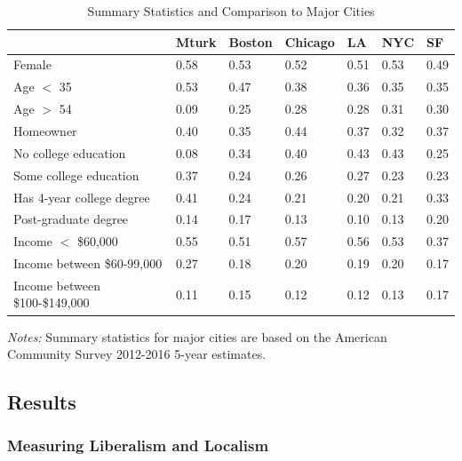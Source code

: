 \documentclass[article,11pt]{memoir}
\begin{document}
\begin{table}
  \begin{threeparttable}
  \caption{Summary Statistics and Comparison to Major Cities}
  \label{tab:e_summary_stats}
  \footnotesize
  \begin{tabularx}{\textwidth}{lXXXXXX}
    \hline
     & Mturk & Boston & Chicago & LA & NYC & SF \\ \hline
  Female & 0.58 & 0.53 & 0.52 & 0.51 & 0.53 & 0.49 \\ 
    Age $<$ 35 & 0.53 & 0.47 & 0.38 & 0.36 & 0.35 & 0.35 \\ 
    Age $>$ 54 & 0.09 & 0.25 & 0.28 & 0.28 & 0.31 & 0.30 \\ 
    Homeowner & 0.40 & 0.35 & 0.44 & 0.37 & 0.32 & 0.37 \\ 
    No college education & 0.08 & 0.34 & 0.40 & 0.43 & 0.43 & 0.25 \\ 
    Some college education & 0.37 & 0.24 & 0.26 & 0.27 & 0.23 & 0.23 \\ 
    Has 4-year college degree & 0.41 & 0.24 & 0.21 & 0.20 & 0.21 & 0.33 \\ 
    Post-graduate degree & 0.14 & 0.17 & 0.13 & 0.10 & 0.13 & 0.20 \\ 
    Income $<$ \$60,000 & 0.55 & 0.51 & 0.57 & 0.56 & 0.53 & 0.37 \\ 
    Income between \$60-99,000 & 0.27 & 0.18 & 0.20 & 0.19 & 0.20 & 0.17 \\ 
    Income between \$100-\$149,000 & 0.11 & 0.15 & 0.12 & 0.12 & 0.13 & 0.17 \\ 
     \hline
  \end{tabularx}
  \begin{tablenotes}[flushleft]
    \item \hspace{-.2em}\emph{Notes:} Summary statistics for major cities are based on the American Community Survey 2012-2016 5-year estimates.
  \end{tablenotes}
  \end{threeparttable}
\end{table}

\subsection{Results}

\subsubsection{Measuring Liberalism and Localism} 
\end{document}

